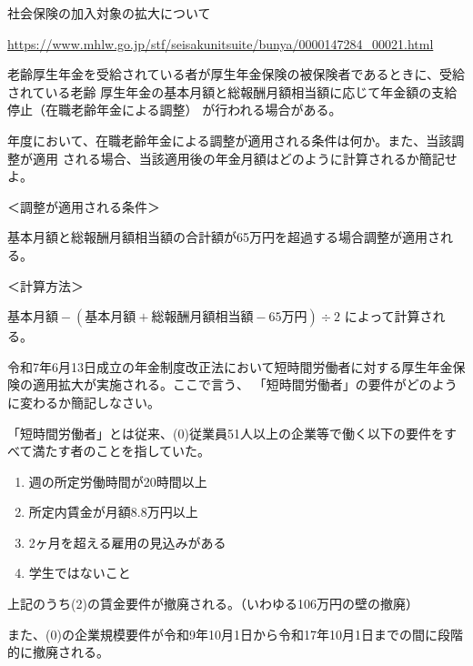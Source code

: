 \begin{explanationbox}
  社会保険の加入対象の拡大について

  \url{https://www.mhlw.go.jp/stf/seisakunitsuite/bunya/0000147284_00021.html}
\end{explanationbox}

\begin{shortanswer}[数理人試験 2024 問題3 設問1 改題]
  老齢厚生年金を受給されている者が厚生年金保険の被保険者であるときに、受給されている老齢
厚生年金の基本月額と総報酬月額相当額に応じて年金額の支給停止（在職老齢年金による調整）
が行われる場合がある。

\warekiyear 年度において、在職老齢年金による調整が適用される条件は何か。また、当該調整が適用
される場合、当該適用後の年金月額はどのように計算されるか簡記せよ。
\end{shortanswer}

\begin{answerbox}
  ＜調整が適用される条件＞

基本月額と総報酬月額相当額の合計額が65万円を超過する場合調整が適用される。

＜計算方法＞

$基本月額 - (基本月額 + 総報酬月額相当額 - 65万円) \div 2$
によって計算される。
\end{answerbox}

\begin{shortanswer}[数理人試験 2024 問題3 設問2 改題]
  令和7年6月13日成立の年金制度改正法において短時間労働者に対する厚生年金保険の適用拡大が実施される。ここで言う、
「短時間労働者」の要件がどのように変わるか簡記しなさい。
\end{shortanswer}

\begin{answerbox}
  「短時間労働者」とは従来、(0)従業員51人以上の企業等で働く以下の要件をすべて満たす者のことを指していた。
  \begin{enumerate}[(1)]
    \item 週の所定労働時間が20時間以上
    \item 所定内賃金が月額8.8万円以上
    \item 2ヶ月を超える雇用の見込みがある
    \item 学生ではないこと
  \end{enumerate}

  上記のうち(2)の賃金要件が撤廃される。（いわゆる106万円の壁の撤廃）

  また、(0)の企業規模要件が令和9年10月1日から令和17年10月1日までの間に段階的に撤廃される。
\end{answerbox}


